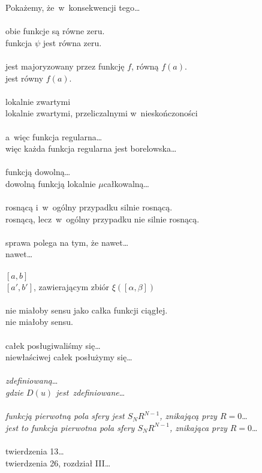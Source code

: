 \documentclass[a4paper,11pt]{article}
\begin{document}
\Pow Pokażemy, że~w~konsekwencji tego\ldots \\
 \\
\Jest obie funkcje są równe zeru. \\
\Pow funkcja $\psi$ jest równa zeru. \\
 \\
\Jest jest majoryzowany przez funkcję $f$, równą $f( a )$. \\
\Pow jest równy $f( a )$.\\
 \\
\Jest lokalnie zwartymi \\
\Pow lokalnie zwartymi, przeliczalnymi w~nieskończoności \\
 \\
\Jest a~więc funkcja regularna\ldots \\
\Pow więc każda funkcja regularna jest borelowska\ldots \\
 \\
\Jest funkcją dowolną\ldots \\
\Pow dowolną funkcją lokalnie $\mu$\dywiz całkowalną\ldots \\
 \\
\Jest rosnącą i~w~ogólny przypadku silnie rosnącą. \\
\Pow rosnącą, lecz~w~ogólny przypadku nie silnie rosnącą. \\
 \\
\Jest sprawa polega na tym, że nawet\ldots \\
\Pow nawet\ldots \\
 \\
\Jest $[ a, b ]$ \\
\Pow $[ a', b' ]$, zawierającym zbiór $\xi( [ \alpha, \beta ] )$ \\
 \\
\Jest nie miałoby sensu jako całka funkcji ciągłej. \\
\Pow nie miałoby sensu. \\
 \\
\Jest całek posługiwaliśmy się\ldots \\
\Pow niewłaściwej całek posłużymy się\ldots \\
 \\
\Jest \emph{zdefiniowaną}\ldots \\
\Pow \emph{gdzie $D( u )$ jest~zdefiniowane}\ldots \\
 \\
\Jest \emph{funkcją pierwotną pola sfery jest $S_{ N } R^{ N - 1 }$,
  znikającą przy $R = 0$}\ldots \\
\Pow \emph{jest to funkcja pierwotna pola sfery $S_{ N } R^{ N - 1 }$,
  znikająca przy $R = 0$}\ldots \\
 \\
\Jest twierdzenia 13\ldots \\
\Pow twierdzenia 26, rozdział III\ldots \\
\end{document}
